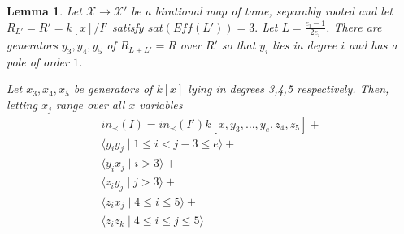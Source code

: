 \documentclass{amsart}
\theoremstyle{plain}
\newtheorem{lem}[thm]{Lemma}
\theoremstyle{definition}
\theoremstyle{remark}
\numberwithin{equation}{section}
\newcommand \sx{\mathscr X}
\newcommand \halfcan{L}
\newcommand \subhalf[1]{\frac{e_{#1} - 1}{2e_{#1}}}
\begin{document}
\begin{lem}
\label{sat_three_induction}
Let $\sx \rightarrow \sx'$ be a birational map of tame, separably
rooted  and let $R_{\halfcan'} = R' = k[x]/I'$ satisfy $sat(Eff(
\halfcan')) = 3.$ Let $\halfcan = \subhalf i$. There are generators
$y_3,y_4,y_5$ of $R_{\halfcan+\halfcan'}= R$ over $R'$ so that $y_i$
 lies in degree $i$ and has a pole of order $1$. 

Let $x_3,x_4,x_5$ be generators of $k[x]$ lying in degrees 3,4,5 
respectively.  Then, letting $x_j$ range over all $x$ variables
\begin{align*}
	in_\prec(I) = in_\prec(I')k[x,y_3,\ldots, y_e,z_4,z_5] + \\
	\langle y_i y_j \mid 1 \leq i < j-3 \leq e \rangle +\\
	\langle y_i x_j \mid i > 3 \rangle +\\
	\langle z_i y_j \mid j > 3 \rangle  +\\
	\langle z_i x_j \mid 4 \leq i \leq 5\rangle + \\
	\langle z_iz_k \mid 4 \leq i \leq j \leq 5 \rangle 
\end{align*}
\end{lem}
\end{document}
